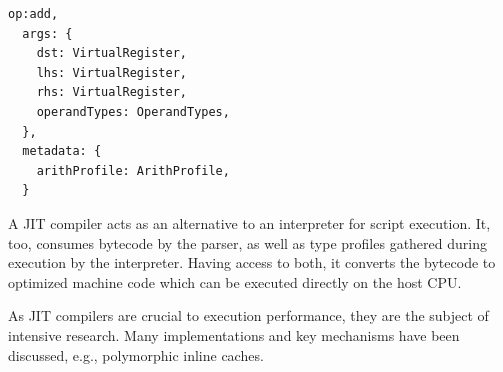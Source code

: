 %
\begin{lstfloat}
\begin{lstlisting}[style=JS,caption=JavScriptCore SyntaxType for OpAdd]
op:add,
  args: {
    dst: VirtualRegister,
    lhs: VirtualRegister,
    rhs: VirtualRegister,
    operandTypes: OperandTypes,
  },
  metadata: {
    arithProfile: ArithProfile,
  }
\end{lstlisting}
\end{lstfloat}%
\vspace{-2.5em}%
%
%
%
%
%
A JIT compiler acts as an alternative to an interpreter for script execution. It, too,
consumes bytecode by the parser, as well as type profiles gathered during execution by the
interpreter.  Having access to both, it converts the bytecode to optimized machine code which
can be executed directly on the host CPU.%

\noindent
As JIT compilers are crucial to execution performance, they are the subject of intensive research.
Many implementations and key mechanisms have been discussed, e.g., polymorphic inline
caches\protect\footnotemark.

